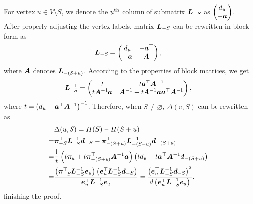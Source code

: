 \documentclass[10pt,twocolumn,twoside]{IEEEtran}
\begin{document}
\begin{IEEEproof}
    For vertex \(u\in V\setminus S\), we denote the \({u}^{\rm{th}}\) column of submatrix \(\boldsymbol{L}_{-S}\) as \(\begin{pmatrix}d_u\\-\boldsymbol{a}\end{pmatrix}\). After properly adjusting the vertex labels, matrix \(\boldsymbol{L}_{-S}\) can be rewritten  in block form as
    \begin{equation*}
        \boldsymbol{L}_{-S}=\begin{pmatrix}d_u & -\boldsymbol{a}^\top \\-\boldsymbol{a}&\boldsymbol{A}\end{pmatrix},
    \end{equation*}
    where \(\boldsymbol{A}\) denotes \(\boldsymbol{L}_{-(S+u)}\).
    According to the properties of block matrices, we  get
    \begin{equation*}
        \boldsymbol{L}_{-S}^{-1}=
        \begin{pmatrix}
            t & t\boldsymbol{a}^\top\boldsymbol{A}^{-1} \\t\boldsymbol{A}^{-1}\boldsymbol{a}&\boldsymbol{A}^{-1}+t\boldsymbol{A}^{-1}\boldsymbol{a}\boldsymbol{a}^\top\boldsymbol{A}^{-1}
        \end{pmatrix},
    \end{equation*}
    where \(t={\left( d_u-\boldsymbol{a}^\top{\boldsymbol{A}}^{-1} \right)}^{-1}\).
    Therefore, when \(S\neq\varnothing\), \(\Delta(u,S)\) can be rewritten as
    \begin{equation*}
        \begin{split}
            &\Delta(u,S)=H(S)-H(S+u)\\
            =&\boldsymbol{\pi}_{-S}^\top\boldsymbol{L}_{-S}^{-1}\boldsymbol{d}_{-S}-\boldsymbol{\pi}_{-(S+u)}^\top\boldsymbol{L}_{-(S+u)}^{-1}\boldsymbol{d}_{-(S+u)}\\
            =&\frac1t\left( t\boldsymbol{\pi}_u+t\boldsymbol{\pi}_{-(S+u)}^\top\boldsymbol{A}^{-1}\boldsymbol{a} \right)\left( td_u+t\boldsymbol{a}^\top\boldsymbol{A}^{-1}\boldsymbol{d}_{-(S+u)} \right)\\       =&\frac{\left( \boldsymbol{\pi}_{-S}^\top\boldsymbol{L}_{-S}^{-1}\boldsymbol{e}_u \right)\left( \boldsymbol{e}_u^\top\boldsymbol{L}_{-S}^{-1}\boldsymbol{d}_{-S} \right)}{\boldsymbol{e}_u^\top\boldsymbol{L}_{-S}^{-1}\boldsymbol{e}_u}=\frac{\left( \boldsymbol{e}_u^\top\boldsymbol{L}_{-S}^{-1}\boldsymbol{d}_{-S} \right)^2}{d\left( \boldsymbol{e}_u^\top\boldsymbol{L}_{-S}^{-1}\boldsymbol{e}_u \right)},
        \end{split}
    \end{equation*}
    finishing the proof.
\end{IEEEproof}
\end{document}
